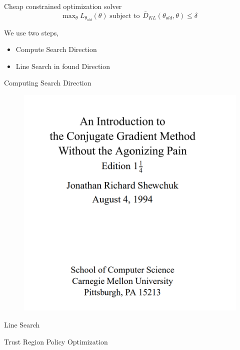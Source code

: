 \documentclass{beamer}
\begin{document}
\begin{frame}{Cheap constrained optimization solver}
\begin{equation*}
    \text{max}_{\theta} \hspace{3pt} L_{\theta_{old}}(\theta) \hspace{3pt} 
     \text{subject to }  \hspace{1pt} \bar{D}_{KL}\left(\theta_{old}, \theta \right) \leq \delta
\end{equation*}

We use two steps, 
\begin{itemize}
    \item Compute Search Direction
    \item Line Search in found Direction
\end{itemize}

\end{frame}

\begin{frame}{Computing Search Direction}

\begin{figure}
    \centering
    \includegraphics[width=0.5\linewidth]{trpo_funny_reference.png}
    \label{fig:joke}
\end{figure}

    
\end{frame}

\begin{frame}{Line Search}
    
\end{frame}


\begin{frame}{Trust Region Policy Optimization}
    
\end{frame}
\end{document}
